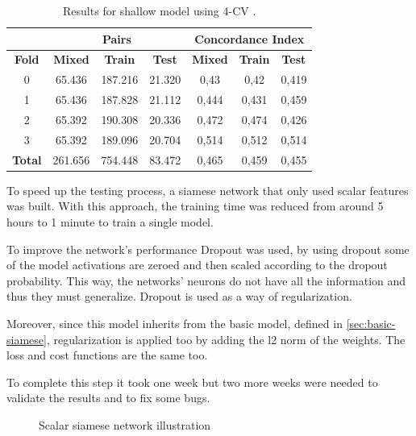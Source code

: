 \begin{table}
  \centering
  \begin{tabular}{|c||c|c|c||c|c|c|}
    \cline{2-7}
    \multicolumn{1}{c|}{} & \multicolumn{3}{|c||}{\textbf{Pairs}} & 
    \multicolumn{3}{c|}{\textbf{Concordance Index}} \\
    \hline
    \textbf{Fold} & \textbf{Mixed} & \textbf{Train} & \textbf{Test} & 
    \textbf{Mixed} & \textbf{Train} & \textbf{Test} \\
    \hhline{=======}
    0 & 65.436 & 187.216 & 21.320 & 0,43 & 0,42 & 0,419 \\
    1 & 65.436 & 187.828 & 21.112 & 0,444 & 0,431 & 0,459 \\
    2 & 65.392 & 190.308 & 20.336 & 0,472 & 0,474 & 0,426 \\
    3 & 65.392 & 189.096 & 20.704 & 0,514 & 0,512 & 0,514 \\
    \hhline{=======}
    \textbf{Total} & 261.656 & 754.448 & 83.472 & 0,465 & 0,459 & 0,455 \\
    \hline
  \end{tabular}

  \caption[Shallow 4-CV results]{
    Results for shallow model using 4-CV \label{tab:results-shallow-4CV}.
  }
\end{table}

\label{sec:scalar-only}

To speed up the testing process, a siamese network that only used scalar features 
was built. With this approach, the training time was reduced from around 5 hours 
to 1 minute to train a single model. 

To improve the network's performance Dropout \cite{neural:dropout} was used, by using 
dropout some of the model activations are zeroed and then scaled according to the 
dropout probability. This way, the networks' neurons do not have all the information and 
thus they must generalize. Dropout is used as a way of regularization. 

Moreover, since this model inherits from the basic model, defined in \autoref{sec:basic-siamese}, 
regularization is applied too by adding the l2 norm of the weights. The loss and
cost functions are the same too.

To complete this step it took one week but two more weeks were needed to validate the results 
and to fix some bugs.

\begin{figure}
  \centering
  
  \caption{Scalar siamese network illustration \label{fig:scalar-implement}}
\end{figure}

